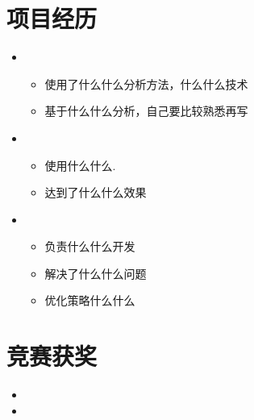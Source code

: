 \documentclass{resume}
\begin{document}
\section{项目经历}
\begin{itemize}
    \item {}
    \ \begin{itemize}
        \item 使用了什么什么分析方法，什么什么技术
        \item 基于什么什么分析，自己要比较熟悉再写
    \ \end{itemize}


    \item {}
    \ \begin{itemize}
      \item 使用什么什么.
      \item 达到了什么什么效果
    \ \end{itemize}

    \item {}
    \ \begin{itemize}
      \item 负责什么什么开发
      \item 解决了什么什么问题
      \item 优化策略什么什么
    \ \end{itemize}

  \end{itemize}

  \section{竞赛获奖}
\begin{itemize}[parsep=0.2ex]
\item {}
\item {}
\end{itemize}
\end{document}
